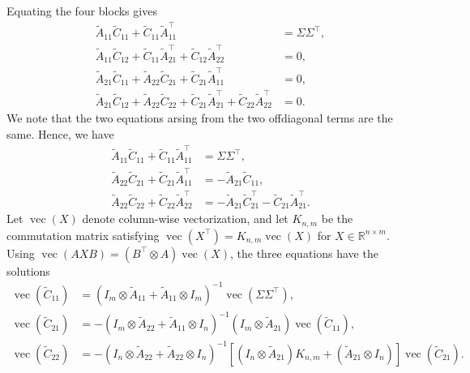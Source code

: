 \documentclass[11pt]{article}
\begin{document}
Equating the four blocks gives
\begin{align}
    \widetilde{A}_{11}\widetilde{C}_{11}
    +\widetilde{C}_{11}\widetilde{A}_{11}^{\top}
     & =\Sigma\Sigma^{\top}, \\
    \widetilde{A}_{11}\widetilde{C}_{12}
    +\widetilde{C}_{11}\widetilde{A}_{21}^{\top}
    +\widetilde{C}_{12}\widetilde{A}_{22}^{\top}
     & =0,                   \\
    \widetilde{A}_{21}\widetilde{C}_{11}
    +\widetilde{A}_{22}\widetilde{C}_{21}
    +\widetilde{C}_{21}\widetilde{A}_{11}^{\top}
     & =0,                   \\
    \widetilde{A}_{21}\widetilde{C}_{12}
    +\widetilde{A}_{22}\widetilde{C}_{22}
    +\widetilde{C}_{21}\widetilde{A}_{21}^{\top}
    +\widetilde{C}_{22}\widetilde{A}_{22}^{\top}
     & =0.
\end{align}
We note that the two equations arsing from the two offdiagonal terms are the same. Hence, we have
\begin{align}
    \widetilde{A}_{11}\widetilde{C}_{11}
    +\widetilde{C}_{11}\widetilde{A}_{11}^{\top}
     & =\Sigma\Sigma^{\top},                          \\
    \widetilde{A}_{22}\widetilde{C}_{21}
    +\widetilde{C}_{21}\widetilde{A}_{11}^{\top}
     & = -\widetilde{A}_{21}\widetilde{C}_{11},       \\
    \widetilde{A}_{22}\widetilde{C}_{22}
    +\widetilde{C}_{22}\widetilde{A}_{22}^{\top}
     & = -\widetilde{A}_{21}\widetilde{C}_{21}^{\top}
    -\widetilde{C}_{21}\widetilde{A}_{21}^{\top}.
\end{align}
Let $\operatorname{vec}(X)$ denote column-wise vectorization, and let
$K_{n,m}$ be the commutation matrix satisfying
$\operatorname{vec}(X^{\top})=K_{n,m}\operatorname{vec}(X)$ for
$X\in\mathbb{R}^{n\times m}$. Using
$\operatorname{vec}(AXB)=(B^{\top}\otimes A)\operatorname{vec}(X)$,
the three equations have the solutions
\begin{align}
    \operatorname{vec}(\widetilde{C}_{11})
     & =\left(I_m\otimes\widetilde{A}_{11}
    +\widetilde{A}_{11}\otimes I_m\right)^{-1}
    \operatorname{vec}(\Sigma\Sigma^{\top}), \\
    \operatorname{vec}(\widetilde{C}_{21})
     & =-\left(I_m\otimes\widetilde{A}_{22}
    +\widetilde{A}_{11}\otimes I_n\right)^{-1}
    (I_m\otimes\widetilde{A}_{21})
    \operatorname{vec}(\widetilde{C}_{11}),  \\
    \operatorname{vec}(\widetilde{C}_{22})
     & =-\left(I_n\otimes\widetilde{A}_{22}
    +\widetilde{A}_{22}\otimes I_n\right)^{-1}
    \left[(I_n\otimes\widetilde{A}_{21})K_{n,m}
        +(\widetilde{A}_{21}\otimes I_n)\right]
    \operatorname{vec}(\widetilde{C}_{21}).
\end{align}
\end{document}
